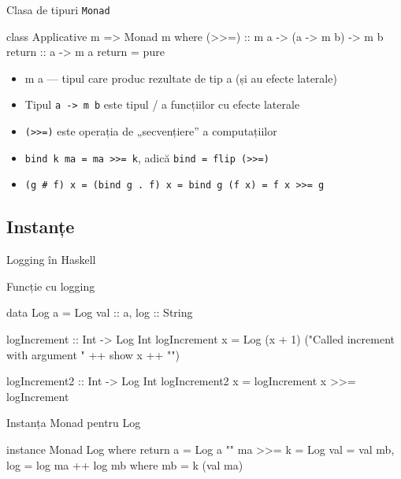 \documentclass[xcolor=pdftex,romanian,colorlinks]{beamer}
\begin{document}


\begin{frame}[fragile]{Clasa de tipuri \lstinline$Monad$}
\begin{asciihs}
class Applicative m => Monad m where
    (>>=) :: m a -> (a -> m b) -> m b
    return :: a -> m a
    return = pure    
\end{asciihs}
\begin{itemize}
\item m a --- tipul  care produc rezultate de tip a (și au efecte laterale)
\item Tipul \lstinline$a -> m b$ este tipul  / a funcțiilor cu efecte laterale

\item \lstinline$(>>=)$ este operația de „secvențiere” a computațiilor

\item \lstinline$bind k ma = ma >>= k$, adică \lstinline$bind = flip (>>=)$
\item \lstinline$(g # f) x = (bind g . f) x = bind g (f x) = f x >>= g$

\end{itemize}
\end{frame}

\subsection{Instanțe}
\begin{frame}[fragile]{Logging în Haskell}
\begin{block}{Funcție cu logging}
\begin{asciihs}
data Log a = Log { val :: a, log :: String }

logIncrement :: Int -> Log Int
logIncrement x = Log (x + 1) ("Called increment with argument " ++ show x ++ "\n")

logIncrement2 :: Int -> Log Int
logIncrement2 x = logIncrement x >>= logIncrement
\end{asciihs}
\end{block}
\begin{block}{Instanța Monad pentru Log}
\begin{asciihs}
instance Monad Log where
  return a = Log a ""
  ma >>= k = Log {val = val mb, log = log ma ++ log mb}
    where mb = k (val ma)
\end{asciihs}
\end{block}
\end{frame}
\end{document}
